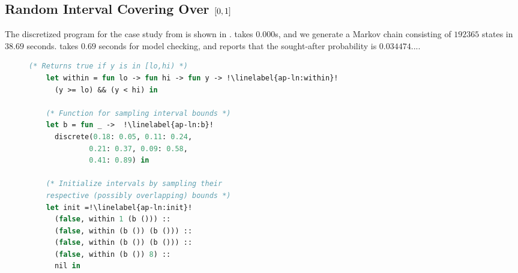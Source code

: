 \subsection{Random Interval Covering Over $\boldmath{[0,1]}$}\label{ap:epsball}
The discretized program for the case study from  is shown in . \Slice{} takes 0.000s, and we generate a Markov chain consisting of $192365$ states in $38.69$ seconds. \Storm takes $0.69$ seconds for model checking, and reports that the sought-after probability is $0.034474...$.

\begin{figure}[t]
    \centering
    \begin{minipage}[t]{0.46\textwidth}
    \vspace{0pt}
    \begin{lstlisting}[aboveskip=0.4em,belowskip=0.4em,
      language=OCaml,
      escapechar=!,
      numbers=right,
      stepnumber=1,
      numberstyle=\color{gray}\scriptsize,
      numbersep=7pt,
      basicstyle=\ttfamily\footnotesize,
      commentstyle=\color{ForestGreen}\itshape,
      gobble=4]
    (* Returns true if y is in [lo,hi) *)
    let within = fun lo -> fun hi -> fun y -> !\linelabel{ap-ln:within}!
      (y >= lo) && (y < hi) in 
    
    (* Function for sampling interval bounds *)
    let b = fun _ ->  !\linelabel{ap-ln:b}!
      discrete(0.18: 0.05, 0.11: 0.24, 
              0.21: 0.37, 0.09: 0.58, 
              0.41: 0.89) in
    
    (* Initialize intervals by sampling their 
    respective (possibly overlapping) bounds *)
    let init =!\linelabel{ap-ln:init}!
      (false, within 1 (b ())) ::
      (false, within (b ()) (b ())) ::
      (false, within (b ()) (b ())) ::
      (false, within (b ()) 8) ::
      nil in 
    

\end{lstlisting}
\end{minipage}
\end{figure}
